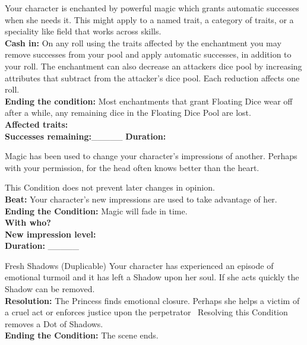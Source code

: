 \documentclass[10pt, frontgrid, backgrid]{flacards}
\begin{document}
{Your character is enchanted by powerful magic which grants automatic successes when she needs it. This might apply to a named trait, a category of traits, or a speciality like field that works across skills.\\
\textbf{Cash in:} On any roll using the traits affected by the enchantment you may remove successes from your pool and apply automatic successes, in addition to your roll.
The enchantment can also decrease an attackers dice pool by increasing attributes that subtract from the attacker's dice pool. Each reduction affects one roll.  \\
\textbf{Ending the condition:} Most enchantments that grant Floating Dice wear off after a while, any remaining dice in the Floating Dice Pool are lost.\\
\textbf{Affected traits:}\fillunderline\\
\textbf{Successes remaining:}\_\_\_\_\_ \textbf{Duration:}\fillunderline}


{Magic has been used to change your character's impressions of another. Perhaps with your permission, for the head often knows better than the heart. 

This Condition does not prevent later changes in opinion. \\

\textbf{Beat:} Your character's new impressions are used to take advantage of her. 
\textbf{Ending the Condition:} Magic will fade in time. \\
\textbf{With who?} \fillunderline \\
\textbf{New impression level:} \fillunderline \\
\textbf{Duration:} \_\_\_\_\_ }

\TCond
{Fresh Shadows (Duplicable)}
{Your character has experienced an episode of emotional turmoil and it has left a Shadow upon her soul. If she acts quickly the Shadow can be removed. \\
\textbf{Resolution:} The Princess finds emotional closure. Perhaps she helps a victim of a cruel act or enforces justice upon the perpetrator \textendash\, Resolving this Condition removes a Dot of Shadows. \\
\textbf{Ending the Condition:} The scene ends. }
\end{document}
